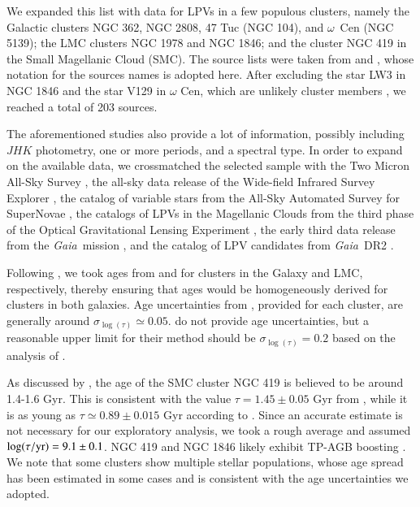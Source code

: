 \documentclass[letter]{aa}
\newcommand{\logAge}{\log(\tau / {\rm yr})}
\newcommand{\gaia}{\textit{Gaia}}
\begin{document}
We expanded this list with data for LPVs in a few populous clusters, namely the Galactic clusters NGC 362, NGC 2808, 47 Tuc (NGC 104), and $\omega$~Cen (NGC 5139); the LMC clusters NGC 1978 and NGC 1846; and the cluster NGC 419 in the Small Magellanic Cloud (SMC). The source lists were taken from \citet{Lebzelter_Wood_2005,Lebzelter_Wood_2007,Lebzelter_Wood_2011,Lebzelter_Wood_2016} and \citet{Kamath_etal_2010}, whose notation for the sources names is adopted here. After excluding the star LW3 in NGC 1846 and the star V129 in $\omega$ Cen, which are unlikely cluster members \citep[cf.][]{Lebzelter_Wood_2007,Lebzelter_Wood_2016}, we reached a total of 203 sources.

The aforementioned studies also provide a lot of information, possibly including $JHK$ photometry, one or more periods, and a spectral type. In order to expand on the available data, we crossmatched the selected sample with the Two Micron All-Sky Survey \citep[2MASS,][]{Skrutskie_etal_2006}, the all-sky data release of the Wide-field Infrared Survey Explorer \citep[AllWISE,][]{Cutri_etal_2013}, the catalog of variable stars from the All-Sky Automated Survey for SuperNovae \citep[ASAS-SN][]{Jayasinghe_etal_2020}, the catalogs of LPVs in the Magellanic Clouds from the third phase of the Optical Gravitational Lensing Experiment \citep[OGLE-III,][]{Soszynski_etal_2009_LMC,Soszynski_etal_2011_SMC}, the early third data release from the \gaia\ mission \citep[\gaia\ EDR3,][]{GaiaCollaboration_2021_EDR3}, and the catalog of LPV candidates from \gaia\ DR2 \citep{Mowlavi_etal_2018}.

Following \citet{Grady_etal_2019}, we took ages from \citet{Kharchenko_etal_2016} and \citet{Baumgardt_etal_2013} for clusters in the Galaxy and LMC, respectively, thereby ensuring that ages would be homogeneously derived for clusters in both galaxies. Age uncertainties from \citet{Baumgardt_etal_2013}, provided for each cluster, are generally around $\sigma_{\log(\tau)}\simeq0.05$. \citet{Kharchenko_etal_2016} do not provide age uncertainties, but a reasonable upper limit for their method should be $\sigma_{\log(\tau)}=0.2$ based on the analysis of \citet{Kharchenko_etal_2005} \citep[the same value was adopted by][in their Fig.~7]{Grady_etal_2019}.

As discussed by \citet{Kamath_etal_2010}, the age of the SMC cluster NGC 419 is believed to be around 1.4-1.6 Gyr. This is consistent with the value $\tau=1.45\pm0.05$ Gyr from \citet{Goudfrooij_etal_2014}, while it is as young as $\tau\simeq0.89\pm0.015$ Gyr according to \citet{Perren_etal_2017}. Since an accurate estimate is not necessary for our exploratory analysis, we took a rough average and assumed $\logAge=9.1\pm0.1$. NGC 419 and NGC 1846 likely exhibit TP-AGB boosting \citep{Girardi_etal_2013}. We note that some clusters show multiple stellar populations, whose age spread has been estimated in some cases \citep[e.g.,][]{Mackey_BrobyNielsen_2007,Joo_Lee_2013,Villanova_etal_2014} and is consistent with the age uncertainties we adopted.
\end{document}
